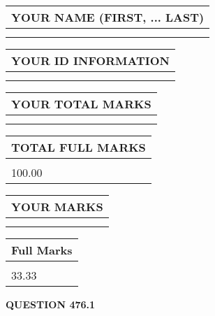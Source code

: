 \documentclass{ctexart}
\begin{document}
   
   
   
\newpage 
\setcounter{page}{ 
   476001 } 
   
   
   
   
\noindent\begin{tabular}{|l|}
\hline
YOUR NAME (FIRST, ... LAST)  \\
\hline
 \\ 
 \\ 
\hline
\end{tabular}
\hspace{0.05in} \begin{tabular}{|l|}
\hline
 YOUR   ID   INFORMATION  \\
\hline
 \\ 
 \\ 
\hline
\end{tabular}
   
   
\vspace{0.2in}\noindent\begin{tabular}{|l|}
\hline
YOUR TOTAL MARKS  \\
\hline
 \\ 
 \\ 
\hline
\end{tabular}
\hspace{0.05in} \begin{tabular}{|l|}
\hline
TOTAL FULL MARKS  \\
\hline
 \\ 
100.00 \\
\hline
\end{tabular}
   
   
 \vspace{0.2in}
 
 
 
 
   
   
  
\vspace{0.2in}
  
\noindent\begin{tabular}{|l|}
\hline
 YOUR MARKS  \\
\hline
 \\ 
 \\ 
\hline
\end{tabular}
\hspace{0.05in} \begin{tabular}{|l|}
\hline
 Full Marks  \\
\hline
 \\ 
33.33 \\
\hline
\end{tabular}
{\textbf{\Large{QUESTION
476.1 
}}}
  
\end{document}
